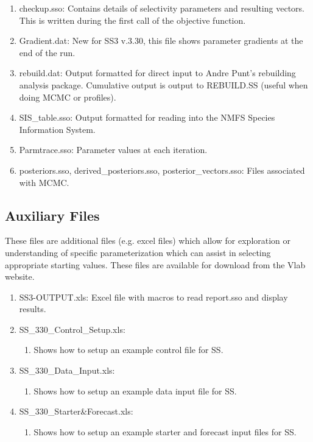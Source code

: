 \begin{enumerate}
		\item checkup.sso: Contains details of selectivity parameters and resulting vectors.  This is written during the first call of the objective function.
		\item Gradient.dat: New for SS3 v.3.30, this file shows parameter gradients at the end of the run.
		\item rebuild.dat: Output formatted for direct input to Andre Punt's rebuilding analysis package.  Cumulative output is output to REBUILD.SS (useful when doing MCMC or profiles).
		\item SIS\_table.sso: Output formatted for reading into the NMFS Species Information System.
		\item Parmtrace.sso: Parameter values at each iteration.
		\item posteriors.sso, derived\_posteriors.sso, posterior\_vectors.sso: Files associated with MCMC.
	\end{enumerate}

	
	\subsection{Auxiliary Files}
	These files are additional files (e.g. excel files) which allow for exploration or understanding of specific parameterization which can assist in selecting appropriate starting values.  These files are available for download from the Vlab website. 
	\begin{enumerate}
		\item SS3-OUTPUT.xls: Excel file with macros to read report.sso and display results.
		\item SS\_330\_Control\_Setup.xls:
		\begin{enumerate}
			\item Shows how to setup an example control file for SS.
		\end{enumerate}
		\item SS\_330\_Data\_Input.xls:
		\begin{enumerate}
			\item Shows how to setup an example data input file for SS.
		\end{enumerate}
		\item SS\_330\_Starter\&Forecast.xls:
		\begin{enumerate}
			\item Shows how to setup an example starter and forecast input files for SS.
		\end{enumerate}

	\end{enumerate}

